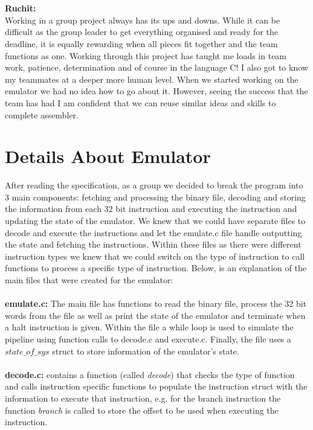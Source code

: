 \documentclass[a4paper]{article}
\begin{document}
\\\\
\textbf{Ruchit:}\\
Working in a group project always has its ups and downs. While it can be difficult as the group leader to get everything organised and ready for the deadline, it is equally rewarding when all pieces fit together and the team functions as one. Working through this project has taught me loads in team work, patience, determination and of course in the language C! I also got to know my teammates at a deeper more human level. When we started working on the emulator we had no idea how to go about it. However, seeing the success that the team has had I am confident that we can reuse similar ideas and skills to complete assembler.

\section{Details About Emulator}
After reading the specification, as a group we decided to break the program into 3 main components: fetching and processing the binary file, decoding and storing the information from each 32 bit instruction and executing the instruction and updating the state of the emulator. We knew that we could have separate files to decode and execute the instructions and let the emulate.c file handle outputting the state and fetching the instructions. Within these files as there were different instruction types we knew that we could switch on the type 
of instruction to call functions to process a specific type of instruction. Below, is an explanation of the main files that were created for the emulator:
\\\\
\textbf{emulate.c:} The main file has functions to read the binary file, process the 32 bit words from the file as well as print the state of the emulator and terminate when a halt instruction is given. Within the file a while loop is used to simulate the pipeline using function calls to decode.c and execute.c. Finally, the file uses a $state\_of\_sys$ struct to store information of the emulator's state.
\\\\
\textbf{decode.c:} contains a function (called \textit{decode}) that checks the type of function  and calls instruction specific functions to populate the instruction struct with the information to execute that instruction, e.g. for the branch  instruction the function \textit{branch} is called to store the offset to be used when executing the instruction.   
\end{document}
